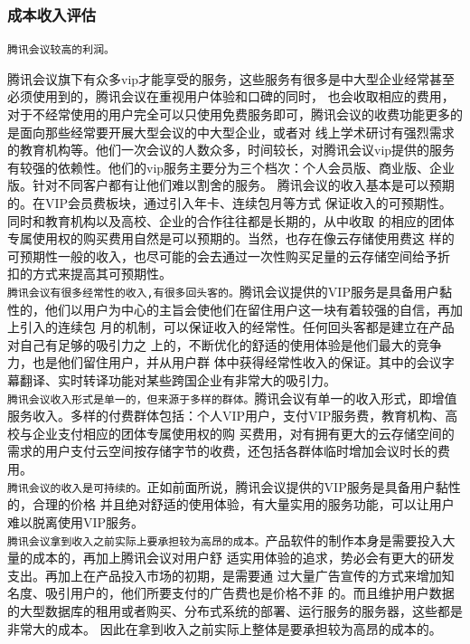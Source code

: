 \documentclass[a4paper,12pt]{article}
\begin{document}
\subsubsection{成本收入评估}
\texttt{腾讯会议较高的利润。}


腾讯会议旗下有众多vip才能享受的服务，这些服务有很多是中大型企业经常甚至必须使用到的，腾讯会议在重视用户体验和口碑的同时，
也会收取相应的费用，对于不经常使用的用户完全可以只使用免费服务即可，腾讯会议的收费功能更多的是面向那些经常要开展大型会议的中大型企业，或者对
线上学术研讨有强烈需求的教育机构等。他们一次会议的人数众多，时间较长，对腾讯会议vip提供的服务有较强的依赖性。他们的vip服务主要分为三个档次：个人会员版、商业版、企业版。针对不同客户都有让他们难以割舍的服务。
腾讯会议的收入基本是可以预期的。在VIP会员费板块，通过引入年卡、连续包月等方式
保证收入的可预期性。同时和教育机构以及高校、企业的合作往往都是长期的，从中收取
的相应的团体专属使用权的购买费用自然是可以预期的。当然，也存在像云存储使用费这
样的可预期性一般的收入，也尽可能的会去通过一次性购买足量的云存储空间给予折
扣的方式来提高其可预期性。\\

\texttt{腾讯会议有很多经常性的收入,有很多回头客的。}腾讯会议提供的VIP服务是具备用户黏性的，他们以用户为中心的主旨会使他们在留住用户这一块有着较强的自信，再加上引入的连续包
月的机制，可以保证收入的经常性。任何回头客都是建立在产品对自己有足够的吸引力之
上的，不断优化的舒适的使用体验是他们最大的竞争力，也是他们留住用户，并从用户群
体中获得经常性收入的保证。其中的会议字幕翻译、实时转译功能对某些跨国企业有非常大的吸引力。\\

\texttt{腾讯会议收入形式是单一的，但来源于多样的群体。}腾讯会议有单一的收入形式，即增值服务收入。多样的付费群体包括：个人VIP用户，支付VIP服务费，教育机构、高校与企业支付相应的团体专属使用权的购
买费用，对有拥有更大的云存储空间的需求的用户支付云空间按存储字节的收费，还包括各群体临时增加会议时长的费用。\\

\texttt{腾讯会议的收入是可持续的。}正如前面所说，腾讯会议提供的VIP服务是具备用户黏性的，合理的价格
并且绝对舒适的使用体验，有大量实用的服务功能，可以让用户难以脱离使用VIP服务。\\

\texttt{腾讯会议拿到收入之前实际上要承担较为高昂的成本。}产品软件的制作本身是需要投入大量的成本的，再加上腾讯会议对用户舒
适实用体验的追求，势必会有更大的研发支出。再加上在产品投入市场的初期，是需要通
过大量广告宣传的方式来增加知名度、吸引用户的，他们所要支付的广告费也是价格不菲
的。而且维护用户数据的大型数据库的租用或者购买、分布式系统的部署、运行服务的服务器，这些都是非常大的成本。
因此在拿到收入之前实际上整体是要承担较为高昂的成本的。\\
\end{document}
